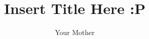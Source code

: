 \documentclass[11pt]{report}
\begin{document}
\title{Insert Title Here :P} 
\author{Your Mother}
\maketitle
\thispagestyle{empty}
\newpage

\tableofcontents
\newpage

\listoffigures
\newpage


\newpage

\newpage

\newpage

\newpage

\newpage

\newpage



\end{document}
